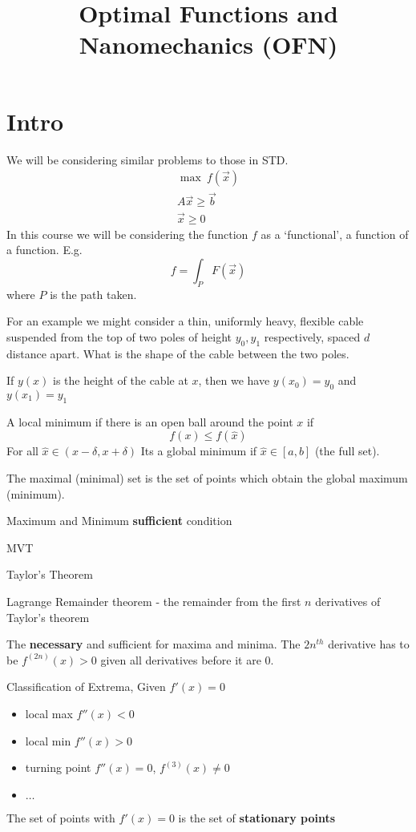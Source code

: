 \documentclass{E:/Documents/Latex/myassignment}
\title{Optimal Functions and Nanomechanics (OFN)}
\begin{document}
\maketitle

\section{Intro}
We will be considering similar problems to those in STD. 
\begin{align*}
	\max \ f(\vec x)\\
	A \vec x \geq \vec b\\
	\vec x \geq 0
\end{align*}
In this course we will be considering the function $f$ as a `functional', a function of a function.
E.g.
\[f = \int_P F(\vec x)\]
where $P$ is the path taken.


For an example we might
consider a thin, uniformly heavy, flexible cable suspended from the top of two poles of height $y_0,y_1$ respectively, spaced $d$ distance apart. What is the shape of the cable between the two poles.

If $y(x)$ is the height of the cable at $x$, then we have $y(x_0) = y_0$ and $y(x_1) = y_1$



A local minimum if there is an open ball around the point $x$ if 
\[f(x) \leq f(\hat{x})\]
For all $\hat{x} \in (x- \delta, x + \delta)$
Its a global minimum if $\hat{x} \in [a,b]$ (the full set).


The maximal (minimal) set is the set of points which obtain the global maximum (minimum).

Maximum and Minimum \textbf{sufficient} condition

MVT

Taylor's Theorem

Lagrange Remainder theorem - the remainder from the first $n$ derivatives of Taylor's theorem 

The \textbf{necessary} and sufficient for maxima and minima.
The $2n^{th}$ derivative has to be $f^{(2n)}(x)>0$ given all derivatives before it are $0$.

Classification of Extrema, Given $f'(x) = 0$
\begin{itemize}
	\item local max $f''(x)<0$
	\item local min $f''(x)>0$
	\item turning point $f''(x)=0$, $f^{(3)}(x) \neq 0$
	\item $\ldots$
\end{itemize}
The set of points with $f'(x) =0$ is the set of \textbf{stationary points}
\end{document}
